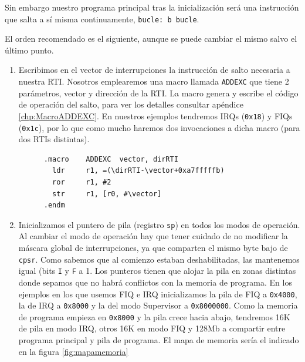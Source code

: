 Sin embargo nuestro programa principal tras la inicialización será una
instrucción que salta a sí misma continuamente, {\tt bucle: b bucle}.

El orden recomendado es el siguiente, aunque se puede cambiar el mismo salvo el último punto.

\begin{enumerate}
  \item Escribimos en el vector de interrupciones la instrucción de salto necesaria a nuestra RTI.
        Nosotros emplearemos una macro llamada {\tt ADDEXC} que tiene 2 parámetros, vector y
        dirección de la RTI. La macro genera y escribe el código de operación
        del salto, para ver los detalles consultar apéndice \ref{chp:MacroADDEXC}.
        En nuestros ejemplos tendremos IRQs ({\tt 0x18}) y FIQs ({\tt 0x1c}), por
        lo que como mucho haremos dos invocaciones a dicha macro (para dos RTIs distintas).
\begin{lstlisting}
      .macro    ADDEXC  vector, dirRTI
        ldr     r1, =(\dirRTI-\vector+0xa7fffffb)
        ror     r1, #2
        str     r1, [r0, #\vector]
      .endm
\end{lstlisting}
  \item Inicializamos el puntero de pila (registro {\tt sp}) en todos los modos de operación.
        Al cambiar el modo de operación hay que tener cuidado de no modificar la máscara
        global de interrupciones, ya que comparten el mismo byte bajo de {\tt cpsr}. Como
        sabemos que al comienzo estaban deshabilitadas, las mantenemos igual (bits {\tt I}
        y {\tt F} a 1.
        Los punteros tienen que alojar la pila en zonas distintas donde sepamos que no
        habrá conflictos con la memoria de programa. En los ejemplos en los que usemos FIQ e
        IRQ inicializamos la pila de FIQ
        a {\tt 0x4000}, la de IRQ a {\tt 0x8000} y la del modo Supervisor a {\tt 0x8000000}.
        Como la memoria de programa empieza en {\tt 0x8000} y la pila crece hacia abajo,
        tendremos 16K de pila en modo IRQ, otros 16K en modo FIQ y 128Mb a compartir entre
        programa principal y pila de programa. El mapa de memoria sería el indicado en la figura
        \ref{fig:mapamemoria}


\end{enumerate}
